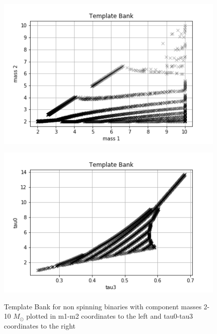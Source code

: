 \documentclass{article}
\begin{document}
\begin{figure}[h]
    \begin{minipage}{0.5\textwidth}
        \includegraphics[scale=0.5]{m1m2.png}
        \label{fig:m1m2}
    \end{minipage}
    \begin{minipage}{0.5\textwidth}
        \includegraphics[scale=0.5]{tau0tau3.png}
        \label{fig:tau0tau3}
    \end{minipage}
    \caption{Template Bank for non spinning binaries with component masses 2-10 $M_{\odot}$ plotted in m1-m2 coordinates to the left and tau0-tau3 coordinates to the right}
\end{figure}
\end{document}
